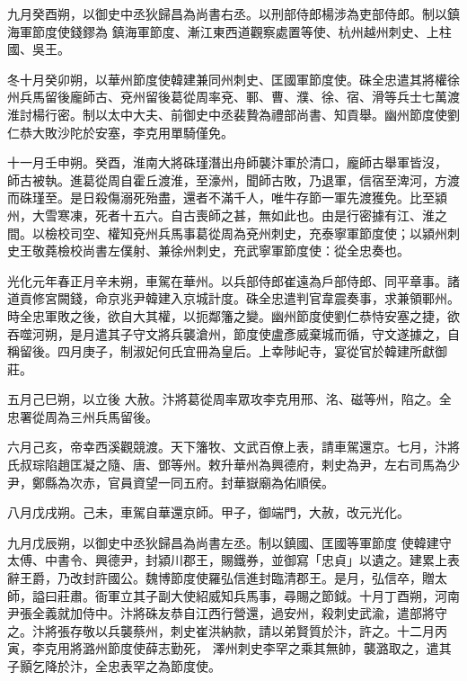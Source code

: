 \begin{pinyinscope}
 九月癸酉朔，以御史中丞狄歸昌為尚書右丞。以刑部侍郎楊涉為吏部侍郎。制以鎮海軍節度使錢鏐為
 鎮海軍節度、漸江東西道觀察處置等使、杭州越州刺史、上柱國、吳王。



 冬十月癸卯朔，以華州節度使韓建兼同州刺史、匡國軍節度使。硃全忠遣其將權徐州兵馬留後龐師古、兗州留後葛從周率兗、鄆、曹、濮、徐、宿、滑等兵士七萬渡淮討楊行密。制以太中大夫、前御史中丞裴贄為禮部尚書、知貢舉。幽州節度使劉仁恭大敗沙陀於安塞，李克用單騎僅免。



 十一月壬申朔。癸酉，淮南大將硃瑾潛出舟師襲汴軍於清口，龐師古舉軍皆沒，
 師古被執。進葛從周自霍丘渡淮，至濠州，聞師古敗，乃退軍，信宿至渒河，方渡而硃瑾至。是日殺傷溺死殆盡，還者不滿千人，唯牛存節一軍先渡獲免。比至潁州，大雪寒凍，死者十五六。自古喪師之甚，無如此也。由是行密據有江、淮之間。以檢校司空、權知兗州兵馬事葛從周為兗州刺史，充泰寧軍節度使；以潁州刺史王敬蕘檢校尚書左僕射、兼徐州刺史，充武寧軍節度使：從全忠奏也。



 光化元年春正月辛未朔，車駕在華州。以兵部侍郎崔遠為戶部侍郎、同平章事。諸道貢修宮闕錢，命京兆尹韓建入京城計度。硃全忠遣判官韋震奏事，求兼領鄆州。時全忠軍敗之後，欲自大其權，以扼鄰籓之變。幽州節度使劉仁恭恃安塞之捷，欲吞噬河朔，是月遣其子守文將兵襲滄州，節度使盧彥威棄城而循，守文遂據之，自稱留後。四月庚子，制淑妃何氏宜冊為皇后。上幸陟屺寺，宴從官於韓建所獻御莊。



 五月己巳朔，以立後
 大赦。汴將葛從周率眾攻李克用邢、洺、磁等州，陷之。全忠署從周為三州兵馬留後。



 六月己亥，帝幸西溪觀競渡。天下籓牧、文武百僚上表，請車駕還京。七月，汴將氏叔琮陷趙匡凝之隨、唐、鄧等州。敕升華州為興德府，剌史為尹，左右司馬為少尹，鄭縣為次赤，官員資望一同五府。封華嶽廟為佑順侯。



 八月戊戌朔。己未，車駕自華還京師。甲子，御端門，大赦，改元光化。



 九月戊辰朔，以御史中丞狄歸昌為尚書左丞。制以鎮國、匡國等軍節度
 使韓建守太傅、中書令、興德尹，封潁川郡王，賜鐵券，並御寫「忠貞」以遺之。建累上表辭王爵，乃改封許國公。魏博節度使羅弘信進封臨清郡王。是月，弘信卒，贈太師，謚曰莊肅。衙軍立其子副大使紹威知兵馬事，尋賜之節鉞。十月丁酉朔，河南尹張全義就加侍中。汴將硃友恭自江西行營還，過安州，殺刺史武渝，遣部將守之。汴將張存敬以兵襲蔡州，刺史崔洪納款，請以弟賢質於汴，許之。十二月丙寅，李克用將潞州節度使薛志勤死，
 澤州刺史李罕之乘其無帥，襲潞取之，遣其子顥乞降於汴，全忠表罕之為節度使。




\end{pinyinscope}
